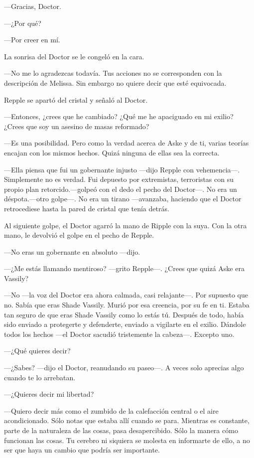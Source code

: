 {---Gracias, Doctor.}

{---¿Por qué?}

{---Por creer en mí.}

{La sonrisa del Doctor se le congeló en la cara.}

{---No me lo agradezcas todavía. Tus acciones no se corresponden con la
	descripción de Melissa. Sin embargo no quiere decir que esté
equivocada.}

{Repple se apartó del cristal y señaló al Doctor.}

{---Entonces, ¿crees que he cambiado? ¿Qué me he apaciguado en mi
exilio? ¿Crees que soy un asesino de masas reformado?}

{---Es una posibilidad. Pero como la verdad acerca de Aske y de ti,
	varias teorías encajan con los mismos hechos. Quizá ninguna de ellas sea
la correcta.}

{---Ella piensa que fui un gobernante injusto ---dijo Repple con
	vehemencia---. Simplemente no es verdad. Fui depuesto por extremistas,
	terroristas con su propio plan retorcido.---golpeó con el dedo el pecho
	del Doctor---. No era un déspota.---otro golpe---. No era un tirano
	---avanzaba, haciendo que el Doctor retrocediese hasta la pared de
cristal que tenía detrás.}

{Al siguiente golpe, el Doctor agarró la mano de Ripple con la suya. Con
la otra mano, le devolvió el golpe en el pecho de Repple.}

{---No eras un gobernante en absoluto ---dijo.}

{---¿Me estás llamando mentiroso? ---grito Repple---. ¿Crees que quizá
Aske era Vassily?}

{---No ---la voz del Doctor era ahora calmada, casi relajante---. Por
	supuesto que no. Sabía que eras Shade Vassily. Murió por esa creencia,
	por su fe en ti. Estaba tan seguro de que eras Shade Vassily como lo
	estás tú. Después de todo, había sido enviado a protegerte y defenderte,
	enviado a vigilarte en el exilio. Dándole todos los hechos ---el Doctor
sacudió tristemente la cabeza---. Excepto uno.}

{---¿Qué quieres decir?}

{---¿Sabes? ---dijo el Doctor, reanudando su paseo---. A veces solo
aprecias algo cuando te lo arrebatan.}

{---¿Quieres decir mi libertad?}

{---Quiero decir más como el zumbido de la calefacción central o el aire
	acondicionado. Sólo notas que estaba allí cuando se para. Mientras es
	constante, parte de la naturaleza de las cosas, pasa desapercibido. Sólo
	la manera cómo funcionan las cosas. Tu cerebro ni siquiera se molesta en
	informarte de ello, a no ser que haya un cambio que podría ser
importante.}


